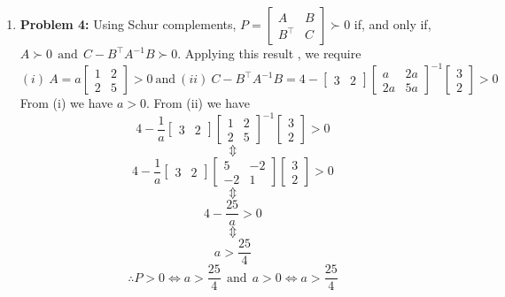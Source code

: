 \documentclass[letterpaper]{article}
\begin{document}
\begin{enumerate}
\item \noindent \textbf{Problem 4:}
Using Schur complements, 
$P = \left[\begin{array}{cc} A & B\\ B^\top & C \end{array}\right] \succ 0$ if, and only if,
$ A \succ 0~~  \text{and} ~~C-B^\top A^{-1} B \succ 0.$ Applying this result , we require
$$(i)~A= a\left[\begin{array}{cc} 1 & 2 \\ 2 & 5 \end{array} \right] >0 ~\text{and}~ (ii)~ C-B^\top A^{-1} B = 4 - \left[\begin{array}{cc} 3 & 2 \end{array} \right] \left[\begin{array}{cc} a & 2a \\ 2a & 5a \end{array} \right]^{-1} \begin{bmatrix} 3 \\ 2\end{bmatrix} > 0$$
From (i) we have $a>0$.
From (ii) we have
$$4-\frac{1}{a} \left[ \begin{array}{cc} 3 & 2\end{array} \right] \left[\begin{array}{cc} 1 & 2\\ 2 & 5 \end{array}\right]^{-1}\begin{bmatrix}3 \\ 2\end{bmatrix} >0 $$
$$\Updownarrow$$
$$4-\frac{1}{a} \left[ \begin{array}{cc} 3 & 2\end{array} \right] \left[\begin{array}{cc} 5 & -2\\ -2 & 1 \end{array}\right]\begin{bmatrix}3 \\ 2\end{bmatrix} >0 $$
$$\Updownarrow$$
$$4-\frac{25}{a}>0$$
$$\Updownarrow$$
$$a>\frac{25}{4}$$
$$\therefore \boxed{P>0 \iff a > \frac{25}{4}~~\text{and} ~~a > 0\iff a > \frac{25}{4} }$$


\end{enumerate}
\end{document}
